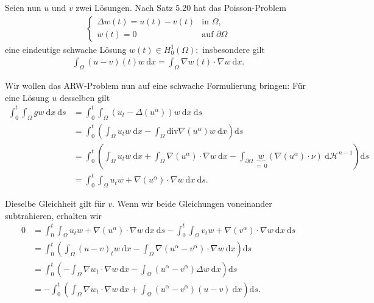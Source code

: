 
\begin{exercise}

\phantom{}

\end{exercise}


\begin{solution}

\phantom{}
Seien nun $u$ und $v$ zwei Lösungen. Nach Satz 5.20 hat das Poisson-Problem
\begin{align}\label{poisson}
\begin{cases}
\Delta w(t) = u(t) - v(t) &\text{in~} \Omega,\\
w(t) = 0 &\text{auf~} \partial\Omega
\end{cases}
\end{align}
eine eindeutige schwache Lösung $w(t) \in H_0^1(\Omega);$ insbesondere gilt
\begin{align*}
    \int_\Omega (u-v)(t) w \mathrm{~d}x = \int_\Omega \nabla w(t) \cdot \nabla w \mathrm{~d}x.
\end{align*}

Wir wollen das ARW-Problem nun auf eine schwache Formulierung bringen: Für eine Lösung $u$ desselben gilt
\begin{align*}
    \int_0^t \int_\Omega gw \mathrm{~d}x \mathrm{~d}s
    &= \int_0^t \int_\Omega \left(u_t - \Delta(u^\alpha)\right) w \mathrm{~d}x \mathrm{~d}s \\
    &= \int_0^t \left(\int_\Omega u_t w \mathrm{~d}x - \int_\Omega \mathrm{div}\nabla(u^\alpha) w \mathrm{~d}x\right) \mathrm{d}s\\
    &= \int_0^t \left(\int_\Omega u_t w \mathrm{~d}x + \int_\Omega \nabla(u^\alpha) \cdot \nabla w \mathrm{~d}x - \int_{\partial\Omega} \underbrace{w}_{=~0}(\nabla(u^\alpha)\cdot\nu) \mathrm{~d}\mathcal{H}^{n-1}\right) \mathrm{d}s\\
    &= \int_0^t \int_\Omega u_t w + \nabla(u^\alpha) \cdot \nabla w \mathrm{~d}x \mathrm{~d}s.
\end{align*}

Dieselbe Gleichheit gilt für $v.$ Wenn wir beide Gleichungen voneinander subtrahieren, erhalten wir
\begin{align*}
    0 &= \int_0^t \int_\Omega u_t w + \nabla(u^\alpha) \cdot \nabla w \mathrm{~d}x \mathrm{~d}s - \int_0^t \int_\Omega v_t w + \nabla(v^\alpha) \cdot \nabla w \mathrm{~d}x \mathrm{~d}s\\
    &= \int_0^t \left(\int_\Omega (u-v)_t w \mathrm{~d}x - \int_\Omega \nabla(u^\alpha - v^\alpha) \cdot \nabla w \mathrm{~d}x\right) \mathrm{d}s\\
    &= \int_0^t \left(- \int_\Omega \nabla w_t \cdot \nabla w \mathrm{~d}x - \int_\Omega (u^\alpha - v^\alpha) \Delta w \mathrm{~d}x\right) \mathrm{d}s\\
    &= - \int_0^t \left(\int_\Omega \nabla w_t \cdot \nabla w \mathrm{~d}x + \int_\Omega (u^\alpha - v^\alpha) (u-v) \mathrm{~d}x\right)\mathrm{d}s.
\end{align*}


\end{solution}
